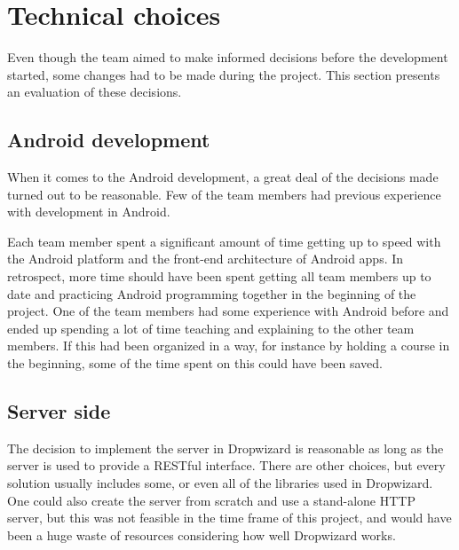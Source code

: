 \section{Technical choices}
Even though the team aimed to make informed decisions before the development started, some changes had to be made during the project. This section presents an evaluation of these decisions.

\subsection{Android development}
When it comes to the Android development, a great deal of the decisions made turned out to be reasonable. Few of the team members had previous experience with development in Android.

Each team member spent a significant amount of time getting up to speed with the Android platform and the front-end architecture of Android apps. In retrospect, more time should have been spent getting all team members up to date and practicing Android programming together in the beginning of the project. One of the team members had some experience with Android before and ended up spending a lot of time teaching and explaining to the other team members. If this had been organized in a way, for instance by holding a course in the beginning, some of the time spent on this could have been saved.

\subsection{Server side}

The decision to implement the server in Dropwizard is reasonable as long as the server is used to provide a RESTful interface. There are other choices, but every solution usually includes some, or even all of the libraries used in Dropwizard. One could also create the server from scratch and use a stand-alone HTTP server, but this was not feasible in the time frame of this project, and would have been a huge waste of resources considering how well Dropwizard works.

